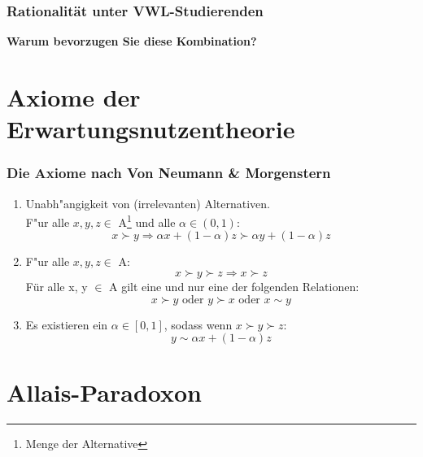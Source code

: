 \documentclass{beamer}
\begin{document}
 \begin{frame}
   \frametitle{Rationalit\"at unter VWL-Studierenden}
   \begin{center}
     

   \huge{\textbf{Warum bevorzugen Sie diese Kombination?}}
   \end{center}
 \end{frame}

\section{Axiome der Erwartungsnutzentheorie}
\label{sec:einfuhrung}
\begin{frame}
  \frametitle{Die Axiome nach Von Neumann \& Morgenstern}
   \begin{enumerate}
  \item<1,4> Unabh"angigkeit von (irrelevanten) Alternativen.\\
    F"ur alle $x, y, z \in$ A\footnote{Menge der Alternative} und alle $\alpha \in (0,1)$:\\
    \begin{equation}
      \label{eq:4}
      x \succ y \Rightarrow \alpha x +(1-\alpha) z \succ \alpha y + (1-\alpha) z  \tag{Unabh"angigkeit}
    \end{equation}

        
  \item<2> F"ur alle $x, y, z \in$ A:
      \begin{equation}
      \label{eq:1}
     x \succ y \succ z \Rightarrow x \succ z \tag{Transitivit"at}
    \end{equation}
    F\"ur alle x, y $\in$ A gilt eine und nur eine der folgenden Relationen:
    \begin{equation}
      \label{eq:2}
     x \succ y \text{ oder } y \succ x \text{ oder } x \sim y \tag{Vollst"andigkeit  \& Asymmetrie}
    \end{equation}
  \item<3> Es existieren ein $\alpha \in [0,1]$, sodass wenn $x \succ y \succ z$:
    \begin{equation}
      \label{eq:3}
      y \sim \alpha x + (1-\alpha) z \tag{Stetigkeit}
    \end{equation}
  \end{enumerate}

\end{frame}

\section{Allais-Paradoxon}
\end{document}
